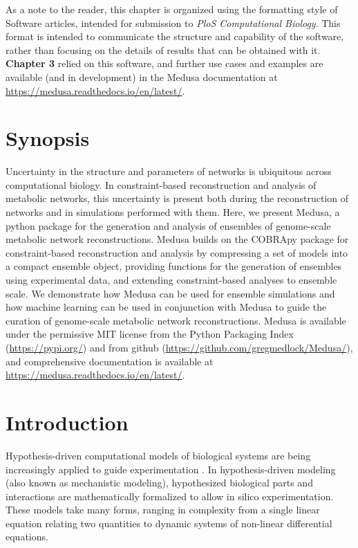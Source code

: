 \documentclass[11pt,onecolumn,notitlepage,openany,twoside]{book}
\begin{document}
\begin{refsection}
As a note to the reader, this chapter is organized using the formatting style of Software articles, intended for submission to \textit{PloS Computational Biology}. This format is intended to communicate the structure and capability of the software, rather than focusing on the details of results that can be obtained with it. \textbf{Chapter 3} relied on this software, and further use cases and examples are available (and in development) in the Medusa documentation at \url{https://medusa.readthedocs.io/en/latest/}.

\section{Synopsis}

Uncertainty in the structure and parameters of networks is ubiquitous across computational biology. In constraint-based reconstruction and analysis of metabolic networks, this uncertainty is present both during the reconstruction of networks and in simulations performed with them. Here, we present Medusa, a python package for the generation and analysis of ensembles of genome-scale metabolic network reconstructions. Medusa builds on the COBRApy package for constraint-based reconstruction and analysis by compressing a set of models into a compact ensemble object, providing functions for the generation of ensembles using experimental data, and extending constraint-based analyses to ensemble scale. We demonstrate how Medusa can be used for ensemble simulations and how machine learning can be used in conjunction with Medusa to guide the curation of genome-scale metabolic network reconstructions. Medusa is available under the permissive MIT license from the Python Packaging Index (\url{https://pypi.org/}) and from github (\url{https://github.com/gregmedlock/Medusa/}), and comprehensive documentation is available at \url{https://medusa.readthedocs.io/en/latest/}.

\section{Introduction}

Hypothesis-driven computational models of biological systems are being increasingly applied to guide experimentation \cite{Kitano2002-az}. In hypothesis-driven modeling (also known as mechanistic modeling), hypothesized biological parts and interactions are mathematically formalized to allow in silico experimentation. These models take many forms, ranging in complexity from a single linear equation relating two quantities to dynamic systems of non-linear differential equations.


\end{refsection}
\end{document}

